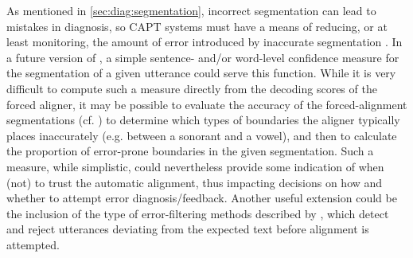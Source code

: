 
	
	
	As mentioned in \cref{sec:diag:segmentation}, 
	incorrect segmentation can lead to mistakes in diagnosis, so CAPT systems must have a means of reducing, or at least monitoring, the amount of error introduced by inaccurate segmentation \citep{Eskenazi2009}. 
	In a future version of , a simple sentence- and/or word-level confidence measure for the segmentation of a given utterance could serve this function. 
	While it is very difficult to compute such a measure directly from the decoding scores of the forced aligner, it may be possible to evaluate the accuracy of the forced-alignment segmentations (cf. \cite{Mesbahi2011}) to determine 
	which types of boundaries the aligner typically places inaccurately (e.g. between a sonorant and a vowel), and then to calculate the proportion of error-prone boundaries in the given segmentation. Such a measure, while simplistic, could nevertheless provide some indication of when (not) to trust the automatic alignment, thus impacting decisions on how and whether to attempt error diagnosis/feedback.
	Another useful extension could be the inclusion of the type of error-filtering methods described by \textcite{Bonneau2012,Orosanu2012}, which detect and reject utterances deviating from the expected text before alignment is attempted.
	
	
	
	
	
	
	
	
